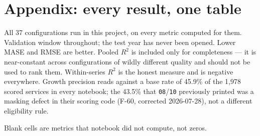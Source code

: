 \documentclass[11pt,a4paper]{article}
\begin{document}
\section{Appendix: every result, one table}

All 37 configurations run in this project, on every metric computed for them. Validation window
throughout; the test year has never been opened. Lower MASE and RMSE are better. Pooled $R^2$ is
included only for completeness --- it is near-constant across configurations of wildly different
quality and should not be used to rank them. Within-series $R^2$ is the honest measure and is negative
everywhere. Growth precision reads against a base rate of 45.9\% of the 1{,}978 scored services in
every notebook; the 43.5\% that \texttt{08}/\texttt{10} previously printed was a masking defect in
their scoring code (F-60, corrected 2026-07-28), not a different eligibility rule.

Blank cells are metrics that notebook did not compute, not zeros.
\end{document}
